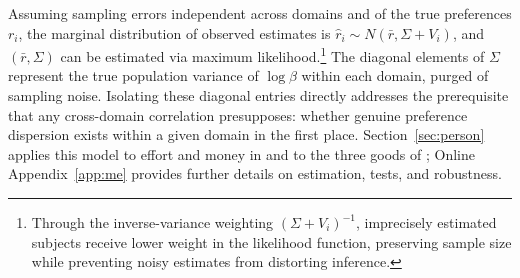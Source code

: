 \documentclass[11pt,a4paper]{article}
\theoremstyle{plain}
\theoremstyle{definition}
\begin{document}
Assuming sampling errors independent across domains and of the true preferences $r_i$, the marginal distribution of observed estimates is $\hat{r}_i \sim N(\bar{r}, \Sigma + V_i)$, and $(\bar{r}, \Sigma)$ can be estimated via maximum likelihood.\footnote{%
Through the inverse-variance weighting $(\Sigma + V_i)^{-1}$, imprecisely estimated subjects receive lower weight in the likelihood function, preserving sample size while preventing noisy estimates from distorting inference.} %
The diagonal elements of $\Sigma$ represent the true population variance of $\log\beta$ within each domain, purged of sampling noise. Isolating these diagonal entries directly addresses the prerequisite that any cross-domain correlation presupposes: whether genuine preference dispersion exists within a given domain in the first place. Section~\ref{sec:person} applies this model to effort and money in \citet{ans2015} and to the three goods of \citet{cheung2022}; Online Appendix~\ref{app:me} provides further details on estimation, tests, and robustness.


\end{document}
